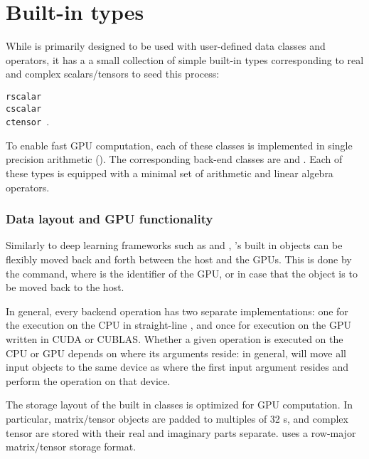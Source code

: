 \section*{Built-in types}

While \Cengine{} is primarily designed to be used with user-defined data classes and operators, it has a 
a small collection of simple built-in types corresponding to real and complex scalars/tensors to 
seed this process:

\texttt{\phantom{MM}rscalar\\\phantom{MM}cscalar\\\phantom{MM}ctensor
}.

To enable fast GPU computation, each of these classes is implemented in single precision arithmetic (). 
The corresponding back-end classes are  and . 
Each of these types is equipped with a minimal set of arithmetic and linear algebra operators. 


\subsubsection*{Data layout and GPU functionality}

Similarly to deep learning frameworks such as  and , \Cengine{}'s built in 
objects can be flexibly moved back and forth between the host and the GPUs. 
This is done by the  command, where  is the identifier of the GPU, or 
 in case that the object is to be moved back to the host. 

In general, every backend operation has two separate implementations: 
one for the execution on the CPU in straight-line \cpp{},  
and once for execution on the GPU written in CUDA or CUBLAS. 
Whether a given operation is executed on the CPU or GPU depends on where its arguments reside: in general, 
\Cengine{} will move all input objects to the same device as where the first input argument resides 
and perform the operation on that device.

The storage layout of the built in classes is optimized for GPU computation. In particular, 
matrix/tensor objects are padded to multiples of 32 s, and complex tensor are stored 
with their real and imaginary parts separate. \Cengine{} uses a row-major matrix/tensor storage format.   